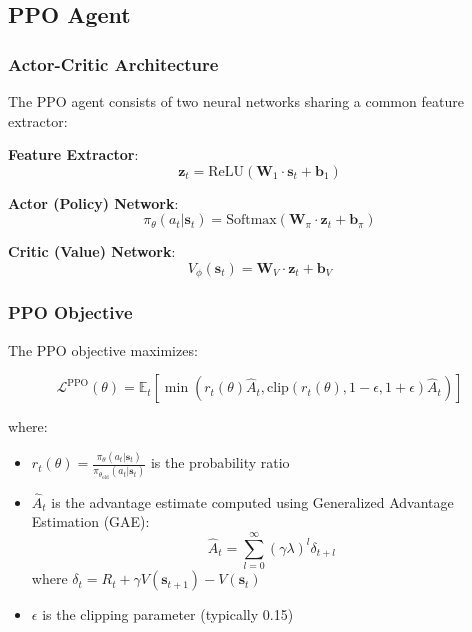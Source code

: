 \subsection{PPO Agent}

\subsubsection{Actor-Critic Architecture}

The PPO agent consists of two neural networks sharing a common feature extractor:

\textbf{Feature Extractor}:
\begin{equation}
\mathbf{z}_t = \text{ReLU}(\mathbf{W}_1 \cdot \mathbf{s}_t + \mathbf{b}_1)
\end{equation}

\textbf{Actor (Policy) Network}:
\begin{equation}
\pi_\theta(a_t | \mathbf{s}_t) = \text{Softmax}(\mathbf{W}_\pi \cdot \mathbf{z}_t + \mathbf{b}_\pi)
\end{equation}

\textbf{Critic (Value) Network}:
\begin{equation}
V_\phi(\mathbf{s}_t) = \mathbf{W}_V \cdot \mathbf{z}_t + \mathbf{b}_V
\end{equation}

\subsubsection{PPO Objective}

The PPO objective maximizes:

\begin{equation}
\mathcal{L}^{\text{PPO}}(\theta) = \mathbb{E}_t\left[\min\left(r_t(\theta)\hat{A}_t, \text{clip}(r_t(\theta), 1-\epsilon, 1+\epsilon)\hat{A}_t\right)\right]
\end{equation}

where:
\begin{itemize}
\item $r_t(\theta) = \frac{\pi_\theta(a_t|\mathbf{s}_t)}{\pi_{\theta_{\text{old}}}(a_t|\mathbf{s}_t)}$ is the probability ratio
\item $\hat{A}_t$ is the advantage estimate computed using Generalized Advantage Estimation (GAE):
\begin{equation}
\hat{A}_t = \sum_{l=0}^{\infty} (\gamma \lambda)^l \delta_{t+l}
\end{equation}
where $\delta_t = R_t + \gamma V(\mathbf{s}_{t+1}) - V(\mathbf{s}_t)$
\item $\epsilon$ is the clipping parameter (typically 0.15)
\end{itemize}

